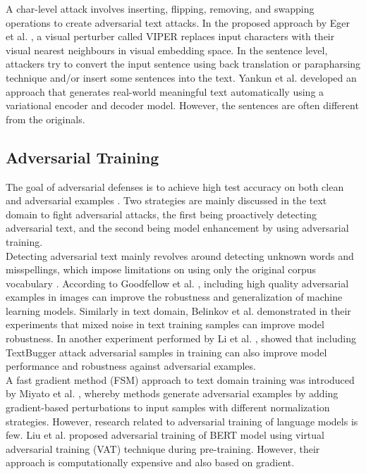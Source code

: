 \documentclass[%
	BCOR=8mm, %
	DIV=12,
	toc=bibliography, %
	toc=listof, %
	oneside, %
	egregdoesnotlikesansseriftitles, %
	]{scrbook}
\begin{document}
A char-level attack involves inserting, flipping, removing, and swapping operations to create adversarial text attacks. In the proposed approach by Eger et al. \cite{eger_text_2019}, a visual perturber called VIPER replaces input characters with their visual nearest neighbours in visual embedding space.
In the sentence level, attackers try to convert the input sentence using back translation or parapharsing technique and/or  insert some sentences into the text. Yankun et al. \cite{ren_generating_2020}  developed an approach that generates real-world meaningful text automatically using a variational encoder and decoder model. However, the sentences are often different from the originals.

\subsection{Adversarial Training}
\label{subsection: adversarialtraining}
The goal of adversarial defenses is to achieve high test accuracy on both clean and adversarial examples \cite{zhou_defense_2020}. Two strategies are mainly discussed in the text domain to fight adversarial attacks, the first being proactively detecting adversarial text, and the second being model enhancement by using adversarial training.\\
 Detecting adversarial text mainly revolves around detecting unknown words and misspellings, which impose limitations on using only the original corpus vocabulary \cite{wang_towards_2021}. 
According to Goodfellow et al. \cite{goodfellow_explaining_2015}, including high quality adversarial examples in images can improve the robustness and generalization of machine learning models. Similarly in text domain, Belinkov et al.  \cite{belinkov_synthetic_2018} demonstrated in their experiments that mixed noise in text training samples can improve model robustness. In another experiment performed by Li et al. \cite{li_textbugger_2019}, showed that including TextBugger attack adversarial samples in training can also improve model performance and robustness against adversarial examples.\\
A fast gradient method (FSM) approach to text domain training was introduced by Miyato et al. \cite{miyato_adversarial_2017}, whereby methods generate adversarial examples by adding gradient-based perturbations to input samples with different normalization strategies.
However, research related to adversarial training of language models is few. Liu et al. \cite{liu_adversarial_2020} proposed adversarial training of BERT model using virtual adversarial training (VAT) technique \cite{miyato_virtual_2018}  during pre-training. However, their approach is computationally expensive and also based on gradient.\\
\end{document}
